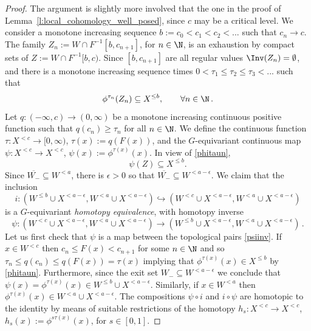 \documentclass[11pt,a4paper,reqno]{article}
\numberwithin{equation}{section}
\theoremstyle{definition}
\begin{document}
\begin{proof}
The argument is slightly more involved that the one in the proof of  Lemma~\ref{l:local_cohomology_well_posed}, since $ c $ may be a critical level. We consider a monotone increasing sequence $b:=c_0<c_1<c_2<...$ such that $c_n\to c$. The family $Z_n:=W\cap F^{-1}[b,c_{n+1}]$, for $n\in\N$, is an exhaustion by compact sets of $Z:=W\cap F^{-1}[b,c)$. Since $[b,c_{n+1}] $ are all regular values  $ \Inv(Z_n)=\emptyset$, and there is a monotone increasing sequence times $0<\tau_1\leq\tau_2\leq\tau_3<...$ such that 
\begin{equation}\label{phitaun}
    \phi^{\tau_n}(Z_n)\subseteq X^{\leq b},\qquad\forall n\in\N \, .
\end{equation}
Let $ q :(-\infty,c)\to(0,\infty)$ be a monotone increasing continuous positive function such that $ q (c_n)\geq\tau_n$ for all $n\in\N$. We define the continuous function $\tau:X^{<c}\to[0,\infty)$, $\tau(x) := q (F(x))$, and the $G$-equivariant continuous map $\psi:X^{<c}\to X^{<c}$, $\psi(x) := \phi^{\tau(x)}(x)$. In view of \eqref{phitaun}, 
\begin{equation}\label{}
    \psi(Z)\subseteq X^{\leq b}.
\end{equation}
Since $\overline{W_-}\subseteq W^{<a}$, there is $\epsilon>0$ so that $\overline{W_-}\subseteq W^{<a-\epsilon}$.
We claim that the inclusion 
\begin{equation}
\label{inc4}
i:
(W^{\leq b}\cup X^{<a-\epsilon},W^{<a}\cup X^{<a-\epsilon})
\hookrightarrow
(W^{<c}\cup X^{<a-\epsilon},W^{<a}\cup X^{<a-\epsilon})
\end{equation}
is a $G$-equivariant {\it homotopy equivalence}, with homotopy inverse 
\begin{equation}
\label{psiinv}
\psi:
(W^{<c}\cup X^{<a-\epsilon},W^{<a}\cup X^{<a-\epsilon})
\to
(W^{\leq b}\cup X^{<a-\epsilon},W^{<a}\cup X^{<a-\epsilon}) \, . 
\end{equation}
Let us first check that 
$ \psi 
$ is a map between  the topological pairs  \eqref{psiinv}.  
If $ x \in W^{<c}$ then
$ c_n \leq F(x) < c_{n+1} $ for some $ n \in \N $
and so
$ \tau_n \leq 
q(c_n) \leq q(F(x))
= \tau(x)$ implying that 
$  \phi^{\tau(x)} (x) \in X^{\leq b }$ by \eqref{phitaun}. 
Furthermore, since 
the exit set $ W_- 
\subseteq W^{<a-\epsilon}$ we conclude that  $ \psi (x) = \phi^{\tau(x)} (x) \in W^{\leq b }
\cup X^{<a-\epsilon}$. 
Similarly, if $ x \in W^{<a} $
then 
$ \phi^{\tau(x)} (x) \in W^{<a} \cup X^{<a-\epsilon} $.
The compositions $\psi\circ i$ and $i\circ\psi$ are homotopic to the identity by means of suitable restrictions of the homotopy $h_s:X^{<c}\to X^{<c}$, $h_s(x) := \phi^{s\tau(x)}(x)$, for $s\in[0,1]$.


\end{proof}
\end{document}
